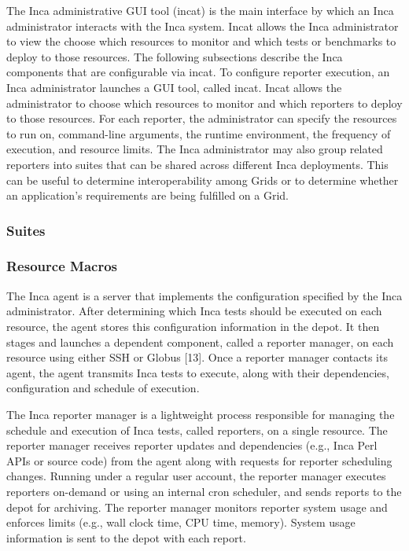 \documentclass[times,10pt,twocolumn]{article}
\begin{document}
The Inca administrative GUI tool (incat) is the main interface by which an
Inca administrator interacts with the Inca system.  Incat allows the Inca
administrator to view the choose which resources to monitor and which tests or 
benchmarks to deploy to those resources.  The following subsections
describe the Inca components that are configurable via incat.  
To configure reporter execution, an Inca administrator launches a GUI tool,
called incat.  Incat allows the administrator to choose which resources to
monitor and which reporters to deploy to those resources.  For each
reporter, the administrator can specify the resources to run on,
command-line arguments, the runtime environment, the frequency of execution,
and resource limits. The Inca administrator may also group related reporters
into suites that can be shared across different Inca deployments.  This can
be useful to determine interoperability among Grids or to determine whether
an application's requirements are being fulfilled on a Grid.

\subsubsection{Suites}

\subsubsection{Resource Macros}


The Inca agent is a server that implements the configuration specified by the
Inca administrator.  After determining which Inca tests should be executed on
each resource, the agent stores this configuration information in the depot.
It then stages and launches a dependent component, called a reporter manager,
on each resource using either SSH or Globus [13].  Once a reporter manager
contacts its agent, the agent transmits Inca tests to execute, along with
their dependencies, configuration and schedule of execution. 
  


The Inca reporter manager is a lightweight process responsible for managing
the schedule and execution of Inca tests, called reporters, on a single
resource. The reporter manager receives reporter updates and dependencies
(e.g., Inca Perl APIs or source code) from the agent along with requests for
reporter scheduling changes.  Running under a regular user account, the
reporter manager executes reporters on-demand or using an internal cron
scheduler, and sends reports to the depot for archiving. The reporter
manager monitors reporter system usage and enforces limits (e.g., wall clock
time, CPU time, memory).  System usage information is sent to the depot with
each report. 
\end{document}
